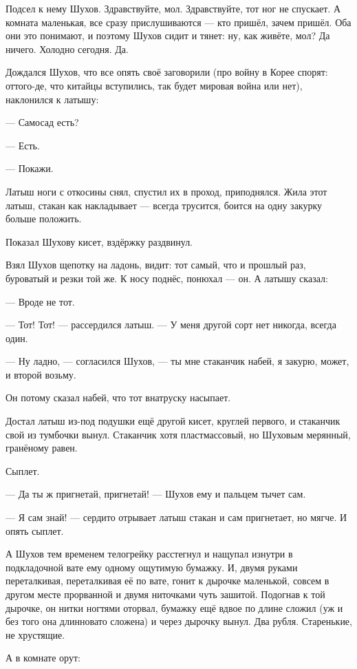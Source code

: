 Подсел к нему Шухов. Здравствуйте, мол. Здравствуйте, тот ног не спускает. А комната 
маленькая, все сразу прислушиваются --- кто пришёл, зачем пришёл. Оба они это понимают, и 
поэтому Шухов сидит и тянет: ну, как живёте, мол? Да ничего. Холодно сегодня. Да.

Дождался Шухов, что все опять своё заговорили (про войну в Корее спорят: оттого-де, что 
китайцы вступились, так будет мировая война или нет), наклонился к латышу:

--- Самосад есть?

--- Есть.

--- Покажи.

Латыш ноги с откосины снял, спустил их в проход, приподнялся. Жила этот латыш, стакан как 
накладывает --- всегда трусится, боится на одну закурку больше положить.

Показал Шухову кисет, вздёржку раздвинул.

Взял Шухов щепотку на ладонь, видит: тот самый, что и прошлый раз, буроватый и резки той же. К 
носу поднёс, понюхал --- он. А латышу сказал:

--- Вроде не тот.

--- Тот! Тот! --- рассердился латыш. --- У меня другой сорт нет никогда, всегда один.

--- Ну ладно, --- согласился Шухов, --- ты мне стаканчик набей, я закурю, может, и второй возьму.

Он потому сказал набей, что тот внатруску насыпает.

Достал латыш из-под подушки ещё другой кисет, круглей первого, и стаканчик свой из тумбочки 
вынул. Стаканчик хотя пластмассовый, но Шуховым мерянный, гранёному равен.

Сыплет.

--- Да ты ж пригнетай, пригнетай! --- Шухов ему и пальцем тычет сам.

--- Я сам знай! --- сердито отрывает латыш стакан и сам пригнетает, но мягче. И опять сыплет.

А Шухов тем временем телогрейку расстегнул и нащупал изнутри в подкладочной вате ему одному 
ощутимую бумажку. И, двумя руками переталкивая, переталкивая её по вате, гонит к дырочке 
маленькой, совсем в другом месте прорванной и двумя ниточками чуть зашитой. Подогнав к той 
дырочке, он нитки ногтями оторвал, бумажку ещё вдвое по длине сложил (уж и без того она 
длинновато сложена) и через дырочку вынул. Два рубля. Старенькие, не хрустящие.

А в комнате орут:

